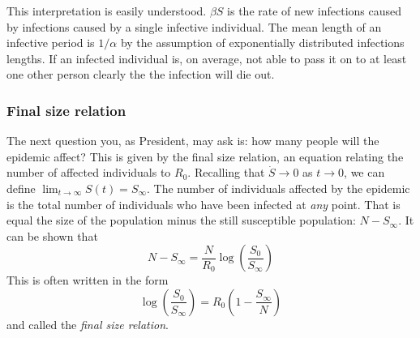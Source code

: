 This interpretation is easily understood. $\beta S$ is the rate of new infections caused by infections caused by a single infective individual. The mean length of an infective period is $1/\alpha$ by the assumption of exponentially distributed infections lengths. If an infected individual is, on average, not able to pass it on to at least one other person clearly the the infection will die out.
\subsubsection{Final size relation}
The next question you, as President, may ask is: how many people will the epidemic affect? This is given by the final size relation, an equation relating the number of affected individuals to $R_0$. Recalling that $\dot S\rightarrow0$ as $t\rightarrow0$, we can define $\lim_{t\rightarrow\infty}S(t)=S_\infty$. The number of individuals affected by the epidemic is the total number of individuals who have been infected at \textit{any} point. That is equal the size of the population minus the still susceptible population: $N-S_\infty$\label{mmd}. It can be shown that\cite{models-epidemiology} \[N-S_\infty=\frac{N}{R_0}\log(\frac{S_0}{S_\infty})\]
This is often written in the form \[\log(\frac{S_0}{S_\infty})=R_0(1-\frac{S_\infty}{N})\]\label{mmd} and called the \textit{final size relation}.
